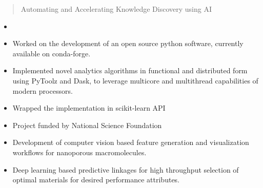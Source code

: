 \documentclass[10pt,a4paper]{altacv}
\begin{document}


\begin{fullwidth}
\makecvheader
\end{fullwidth}


\begin{quote}
Automating and Accelerating Knowledge Discovery using AI
\end{quote}


\begin{itemize}
\item {}
\item Worked on the development of an open source python software,
currently available on conda-forge.
\item Implemented novel analytics algorithms in functional
and distributed form using PyToolz and Dask, to leverage multicore and
multithread capabilities of modern processors.
\item Wrapped the implementation in scikit-learn API
\end{itemize}
\divider

\begin{itemize}
\item Project funded by National Science Foundation
\item Development of computer vision based feature generation and visualization workflows for nanoporous
macromolecules.
\item Deep learning based predictive linkages for high throughput selection of optimal materials for
desired performance attributes.
\end{itemize}
\divider
\end{document}
